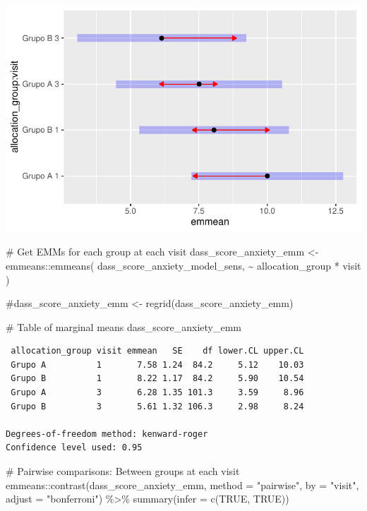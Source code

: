 \documentclass[
  letterpaper,
  DIV=11,
  numbers=noendperiod]{scrartcl}
\newenvironment{Shaded}{\begin{snugshade}}{\end{snugshade}}
\newcommand{\AttributeTok}[1]{\textcolor[rgb]{0.40,0.45,0.13}{#1}}
\newcommand{\CommentTok}[1]{\textcolor[rgb]{0.37,0.37,0.37}{#1}}
\newcommand{\ConstantTok}[1]{\textcolor[rgb]{0.56,0.35,0.01}{#1}}
\newcommand{\FunctionTok}[1]{\textcolor[rgb]{0.28,0.35,0.67}{#1}}
\newcommand{\NormalTok}[1]{\textcolor[rgb]{0.00,0.23,0.31}{#1}}
\newcommand{\OtherTok}[1]{\textcolor[rgb]{0.00,0.23,0.31}{#1}}
\newcommand{\SpecialCharTok}[1]{\textcolor[rgb]{0.37,0.37,0.37}{#1}}
\newcommand{\StringTok}[1]{\textcolor[rgb]{0.13,0.47,0.30}{#1}}
\begin{document}
\includegraphics{Outcomes_V1V2V3_files/figure-pdf/dass_score_anxiety_raw_emm-1.pdf}

\begin{Shaded}
\begin{Highlighting}[]
\CommentTok{\# Get EMMs for each group at each visit}
\NormalTok{dass\_score\_anxiety\_emm }\OtherTok{\textless{}{-}}\NormalTok{ emmeans}\SpecialCharTok{::}\FunctionTok{emmeans}\NormalTok{(}
\NormalTok{    dass\_score\_anxiety\_model\_sens, }
    \SpecialCharTok{\textasciitilde{}}\NormalTok{ allocation\_group }\SpecialCharTok{*}\NormalTok{ visit}
\NormalTok{)}

\CommentTok{\#dass\_score\_anxiety\_emm \textless{}{-} regrid(dass\_score\_anxiety\_emm)}

\CommentTok{\# Table of marginal means}
\NormalTok{dass\_score\_anxiety\_emm}
\end{Highlighting}
\end{Shaded}

\begin{verbatim}
 allocation_group visit emmean   SE    df lower.CL upper.CL
 Grupo A          1       7.58 1.24  84.2     5.12    10.03
 Grupo B          1       8.22 1.17  84.2     5.90    10.54
 Grupo A          3       6.28 1.35 101.3     3.59     8.96
 Grupo B          3       5.61 1.32 106.3     2.98     8.24

Degrees-of-freedom method: kenward-roger 
Confidence level used: 0.95 
\end{verbatim}

\begin{Shaded}
\begin{Highlighting}[]
\CommentTok{\# Pairwise comparisons: Between groups at each visit}
\NormalTok{emmeans}\SpecialCharTok{::}\FunctionTok{contrast}\NormalTok{(dass\_score\_anxiety\_emm, }\AttributeTok{method =} \StringTok{"pairwise"}\NormalTok{, }\AttributeTok{by =} \StringTok{"visit"}\NormalTok{, }\AttributeTok{adjust =} \StringTok{"bonferroni"}\NormalTok{) }\SpecialCharTok{\%\textgreater{}\%} \FunctionTok{summary}\NormalTok{(}\AttributeTok{infer =} \FunctionTok{c}\NormalTok{(}\ConstantTok{TRUE}\NormalTok{, }\ConstantTok{TRUE}\NormalTok{))}
\end{Highlighting}
\end{Shaded}
\end{document}
